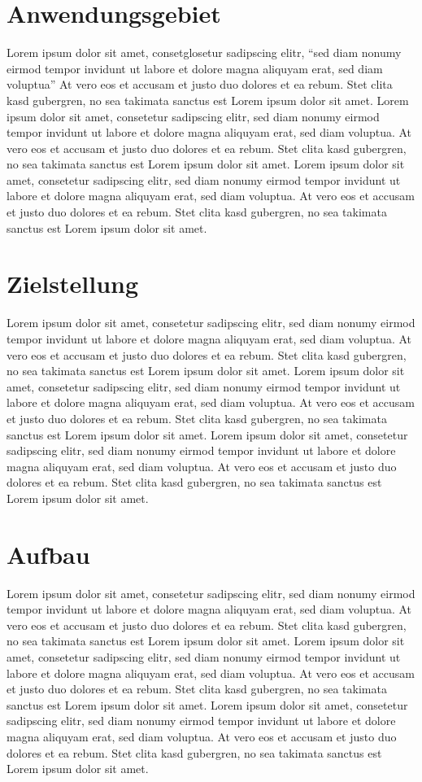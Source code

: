\section{Anwendungsgebiet}
Lorem ipsum dolor sit amet, consetglosetur sadipscing elitr, "`sed diam nonumy eirmod tempor invidunt ut labore et dolore magna aliquyam erat, sed diam voluptua"'  At vero eos et accusam et justo duo dolores et ea rebum. Stet clita kasd gubergren, no sea takimata sanctus est Lorem ipsum dolor sit amet. Lorem ipsum dolor sit amet, consetetur sadipscing elitr, sed diam nonumy eirmod tempor invidunt ut labore et dolore magna aliquyam erat, sed diam voluptua. At vero eos et accusam et justo duo dolores et ea rebum. Stet clita kasd gubergren, no sea takimata sanctus est Lorem ipsum dolor sit amet. Lorem ipsum dolor sit amet, consetetur sadipscing elitr, sed diam nonumy eirmod tempor invidunt ut labore et dolore magna aliquyam erat, sed diam voluptua. At vero eos et accusam et justo duo dolores et ea rebum. Stet clita kasd gubergren, no sea takimata sanctus est Lorem ipsum dolor sit amet.
\section{Zielstellung}
Lorem ipsum dolor sit amet,  consetetur sadipscing elitr, sed diam nonumy eirmod tempor invidunt ut labore et dolore magna aliquyam erat, sed diam voluptua. At vero eos et accusam et justo duo dolores et ea rebum. Stet clita kasd gubergren, no sea takimata sanctus est Lorem ipsum dolor sit amet. Lorem ipsum dolor sit amet, consetetur sadipscing elitr, sed diam nonumy eirmod tempor invidunt ut labore et dolore magna aliquyam erat, sed diam voluptua. At vero eos et accusam et justo duo dolores et ea rebum. Stet clita kasd gubergren, no sea takimata sanctus est Lorem ipsum dolor sit amet. Lorem ipsum dolor sit amet, consetetur sadipscing elitr, sed diam nonumy eirmod tempor invidunt ut labore et dolore magna aliquyam erat, sed diam voluptua. At vero eos et accusam et justo duo dolores et ea rebum. Stet clita kasd gubergren, no sea takimata sanctus est Lorem ipsum dolor sit amet.
\section{Aufbau}
Lorem ipsum dolor sit amet, consetetur sadipscing elitr, sed diam nonumy eirmod tempor invidunt ut labore et dolore magna aliquyam erat, sed diam voluptua. At vero eos et accusam et justo duo dolores et ea rebum. Stet clita kasd gubergren, no sea takimata sanctus est Lorem ipsum dolor sit amet. Lorem ipsum dolor sit amet, consetetur sadipscing elitr, sed diam nonumy eirmod tempor invidunt ut labore et dolore magna aliquyam erat, sed diam voluptua. At vero eos et accusam et justo duo dolores et ea rebum. Stet clita kasd gubergren, no sea takimata sanctus est Lorem ipsum dolor sit amet. Lorem ipsum dolor sit amet, consetetur sadipscing elitr, sed diam nonumy eirmod tempor invidunt ut labore et dolore magna aliquyam erat, sed diam voluptua. At vero eos et accusam et justo duo dolores et ea rebum. Stet clita kasd gubergren, no sea takimata sanctus est Lorem ipsum dolor sit amet.
\endinput 